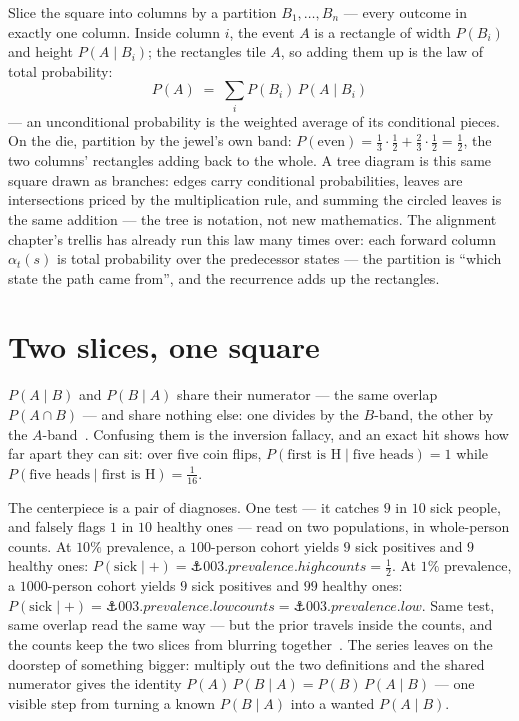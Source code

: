 \begin{narrative}
Slice the square into columns by a partition $B_1, \dots, B_n$ — every
outcome in exactly one column. Inside column $i$, the event $A$ is a
rectangle of width $P(B_i)$ and height $P(A \mid B_i)$; the rectangles
tile $A$, so adding them up is the law of total probability:
\[
  P(A) \;=\; \sum_i P(B_i)\,P(A \mid B_i)
\]
— an unconditional probability is the weighted average of its
conditional pieces. On the die, partition by the jewel's own band:
$P(\text{even}) = \tfrac13 \cdot \tfrac12 + \tfrac23 \cdot \tfrac12 =
\tfrac12$, the two columns' rectangles adding back to the whole. A tree
diagram is this same square drawn as branches: edges carry conditional
probabilities, leaves are intersections priced by the multiplication
rule, and summing the circled leaves is the same addition — the tree is
notation, not new mathematics. The alignment chapter's trellis has
already run this law many times over: each forward column
$\alpha_t(s)$ is total probability over the predecessor states — the
partition is ``which state the path came from'', and the recurrence
adds up the rectangles.

\section{Two slices, one square}

$P(A \mid B)$ and $P(B \mid A)$ share their numerator — the same
overlap $P(A \cap B)$ — and share nothing else: one divides by the
$B$-band, the other by the
$A$-band~\cite{probability-3blue1brown-the-quick-proof-of-bayes-theorem}.
Confusing them is the inversion fallacy, and an exact hit shows how
far apart they can sit: over five coin flips,
$P(\text{first is H} \mid \text{five heads}) = 1$ while
$P(\text{five heads} \mid \text{first is H}) = \tfrac{1}{16}$.

The centerpiece is a pair of diagnoses. One test — it catches $9$ in
$10$ sick people, and falsely flags $1$ in $10$ healthy ones — read on
two populations, in whole-person counts. At $10\%$ prevalence, a
$100$-person cohort yields $9$ sick positives and $9$ healthy ones:
$P(\text{sick} \mid +) = \anchor{003.prevalence.highcounts} = \tfrac12$.
At $1\%$ prevalence, a $1000$-person cohort yields $9$ sick positives
and $99$ healthy ones:
$P(\text{sick} \mid +) = \anchor{003.prevalence.lowcounts} =
\anchor{003.prevalence.low}$. Same test, same overlap read the same
way — but the prior travels inside the counts, and the counts keep the
two slices from blurring
together~\cite{probability-b-cherer-linder-eichler-2017-frontiers-open-access}.
The series leaves on the doorstep of something bigger: multiply out the
two definitions and the shared numerator gives the identity
$P(A)\,P(B \mid A) = P(B)\,P(A \mid B)$ — one visible step from turning
a known $P(B \mid A)$ into a wanted $P(A \mid B)$.


\end{narrative}
